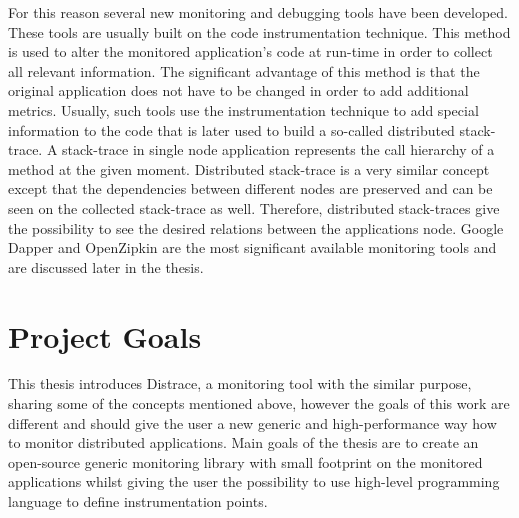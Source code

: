 For this reason several new monitoring and debugging tools have been developed. These tools are usually built on the code instrumentation technique. This method is used to alter the monitored application's code at run-time in order to collect all relevant information. The significant advantage of this method is that the original application does not have to be changed in order to add additional metrics. Usually, such tools use the instrumentation technique to add special information to the code that is later used to build a so-called distributed stack-trace.  A stack-trace in single node application represents the call hierarchy of a method at the given moment. Distributed stack-trace is a very similar concept except that the dependencies between different nodes are preserved and can be seen on the collected stack-trace as well. Therefore, distributed stack-traces give the possibility to see the desired relations between the applications node. Google Dapper and OpenZipkin are the most significant available monitoring tools and are discussed later in the thesis. 


\section{Project Goals}
This thesis introduces Distrace, a monitoring tool with the similar purpose, sharing some of the concepts mentioned above, however the goals of this work are different and should give the user a new generic and high-performance way how to monitor distributed applications. Main goals of the thesis are to create an open-source generic monitoring library with small footprint on the monitored applications whilst giving the user the possibility to use high-level programming language to define instrumentation points.

